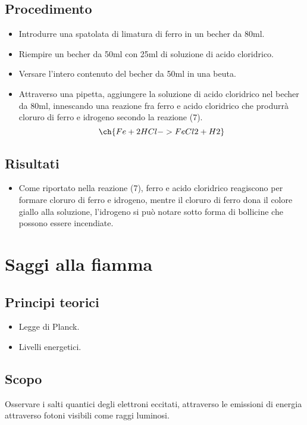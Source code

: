 \documentclass[a4paper,10pt]{article}
\begin{document}
	\subsection{Procedimento}
	\begin{itemize}
		\item Introdurre una spatolata di limatura di ferro in un becher da 80ml.
		\item Riempire un becher da 50ml con 25ml di soluzione di acido cloridrico.
		\item Versare l'intero contenuto del becher da 50ml in una beuta.
		\item Attraverso una pipetta, aggiungere la soluzione di acido cloridrico nel becher da 80ml, innescando una reazione fra ferro e acido cloridrico che produrrà cloruro di ferro e idrogeno secondo la reazione (7).
		\begin{equation}
			\ch{Fe + 2 HCl -> FeCl2 + H2}
		\end{equation}
	\end{itemize}
	\subsection{Risultati}
	\begin{itemize}
		\item Come riportato nella reazione (7), ferro e acido cloridrico reagiscono per formare cloruro di ferro e idrogeno, mentre il cloruro di ferro dona il colore giallo alla soluzione, l'idrogeno si può notare sotto forma di bollicine che possono essere incendiate.
	\end{itemize}
	
	\break
	
	\section{Saggi alla fiamma}
	\subsection{Principi teorici}
	\begin{itemize}
		\item Legge di Planck.
		\item Livelli energetici.
	\end{itemize}
	\subsection{Scopo}
	Osservare i salti quantici degli elettroni eccitati, attraverso le emissioni di energia attraverso fotoni visibili come raggi luminosi.
\end{document}
